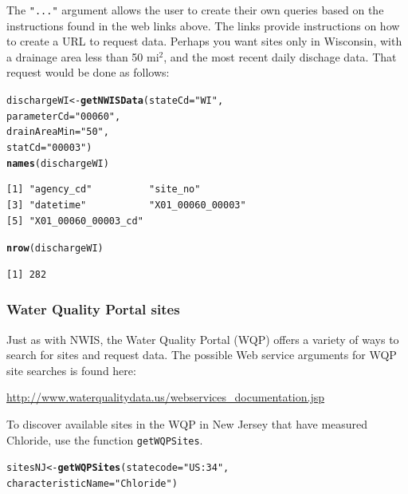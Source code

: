 \documentclass[a4paper,11pt]{article}\usepackage[]{graphicx}\usepackage[]{color}
\makeatletter
\newcommand{\hlstr}[1]{\textcolor[rgb]{0.192,0.494,0.8}{#1}}%
\newcommand{\hlstd}[1]{\textcolor[rgb]{0.345,0.345,0.345}{#1}}%
\newcommand{\hlkwb}[1]{\textcolor[rgb]{0.69,0.353,0.396}{#1}}%
\newcommand{\hlkwc}[1]{\textcolor[rgb]{0.333,0.667,0.333}{#1}}%
\newcommand{\hlkwd}[1]{\textcolor[rgb]{0.737,0.353,0.396}{\textbf{#1}}}%
\newenvironment{kframe}{%
 \def\at@end@of@kframe{}%
 \ifinner\ifhmode%
  \def\at@end@of@kframe{\end{minipage}}%
  \begin{minipage}{\columnwidth}%
 \fi\fi%
 \def\FrameCommand##1{\hskip\@totalleftmargin \hskip-\fboxsep
 \colorbox{shadecolor}{##1}\hskip-\fboxsep
     \hskip-\linewidth \hskip-\@totalleftmargin \hskip\columnwidth}%
 \MakeFramed {\advance\hsize-\width
   \@totalleftmargin\z@ \linewidth\hsize
   \@setminipage}}%
 {\par\unskip\endMakeFramed%
 \at@end@of@kframe}
\newenvironment{knitrout}{}{} %
\makeatother
\begin{document}
The \texttt{"..."} argument allows the user to create their own queries based on the instructions found in the web links above. The links provide instructions on how to create a URL to request data. Perhaps you want sites only in Wisconsin, with a drainage area less than 50 mi$^2$, and the most recent daily dischage data. That request would be done as follows:

\begin{knitrout}
\color{fgcolor}\begin{kframe}
\begin{alltt}
\hlstd{dischargeWI} \hlkwb{<-} \hlkwd{getNWISData}\hlstd{(}\hlkwc{stateCd}\hlstd{=}\hlstr{"WI"}\hlstd{,}
                           \hlkwc{parameterCd}\hlstd{=}\hlstr{"00060"}\hlstd{,}
                           \hlkwc{drainAreaMin}\hlstd{=}\hlstr{"50"}\hlstd{,}
                           \hlkwc{statCd}\hlstd{=}\hlstr{"00003"}\hlstd{)}
\hlkwd{names}\hlstd{(dischargeWI)}
\end{alltt}
\begin{verbatim}
[1] "agency_cd"          "site_no"           
[3] "datetime"           "X01_00060_00003"   
[5] "X01_00060_00003_cd"
\end{verbatim}
\begin{alltt}
\hlkwd{nrow}\hlstd{(dischargeWI)}
\end{alltt}
\begin{verbatim}
[1] 282
\end{verbatim}
\end{kframe}
\end{knitrout}

\subsubsection{Water Quality Portal sites}
\label{sec:WQPGenSite}

Just as with NWIS, the Water Quality Portal (WQP) offers a variety of ways to search for sites and request data. The possible Web service arguments for WQP site searches is found here:

\url{http://www.waterqualitydata.us/webservices_documentation.jsp}

To discover available sites in the WQP in New Jersey that have measured Chloride, use the function \texttt{getWQPSites}.

\begin{knitrout}
\color{fgcolor}\begin{kframe}
\begin{alltt}
\hlstd{sitesNJ} \hlkwb{<-} \hlkwd{getWQPSites}\hlstd{(}\hlkwc{statecode}\hlstd{=}\hlstr{"US:34"}\hlstd{,}
                       \hlkwc{characteristicName}\hlstd{=}\hlstr{"Chloride"}\hlstd{)}
\end{alltt}
\end{kframe}
\end{knitrout}
\end{document}
